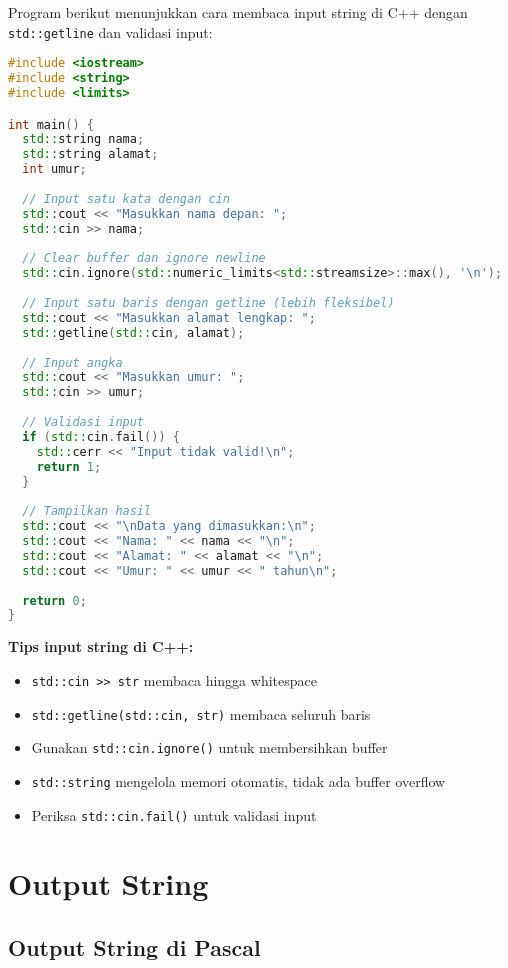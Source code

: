 \documentclass[../main.tex]{subfiles}
\begin{document}
Program berikut menunjukkan cara membaca input string di C++ dengan \texttt{std::getline} dan validasi input:

\begin{lstlisting}[language=C++, caption={Input string di C++}]
#include <iostream>
#include <string>
#include <limits>

int main() {
  std::string nama;
  std::string alamat;
  int umur;
  
  // Input satu kata dengan cin
  std::cout << "Masukkan nama depan: ";
  std::cin >> nama;
  
  // Clear buffer dan ignore newline
  std::cin.ignore(std::numeric_limits<std::streamsize>::max(), '\n');
  
  // Input satu baris dengan getline (lebih fleksibel)
  std::cout << "Masukkan alamat lengkap: ";
  std::getline(std::cin, alamat);
  
  // Input angka
  std::cout << "Masukkan umur: ";
  std::cin >> umur;
  
  // Validasi input
  if (std::cin.fail()) {
    std::cerr << "Input tidak valid!\n";
    return 1;
  }
  
  // Tampilkan hasil
  std::cout << "\nData yang dimasukkan:\n";
  std::cout << "Nama: " << nama << "\n";
  std::cout << "Alamat: " << alamat << "\n";
  std::cout << "Umur: " << umur << " tahun\n";
  
  return 0;
}
\end{lstlisting}

\textbf{Tips input string di C++:}
\begin{itemize}
  \item \texttt{std::cin >> str} membaca hingga whitespace
  \item \texttt{std::getline(std::cin, str)} membaca seluruh baris
  \item Gunakan \texttt{std::cin.ignore()} untuk membersihkan buffer
  \item \texttt{std::string} mengelola memori otomatis, tidak ada buffer overflow
  \item Periksa \texttt{std::cin.fail()} untuk validasi input
\end{itemize}

\section{Output String}

\subsection{Output String di Pascal}
\end{document}
